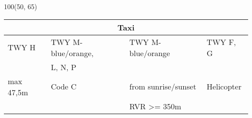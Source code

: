 \documentclass[10pt,landscape,a4paper]{article}
\begin{document}
\begin{textblock}{100}(50, 65)
\begin{table}[]
\begin{tabular}{|l|l|l|l|}
\multicolumn{4}{c}{\textbf{Taxi}} \\ \hline
TWY H & TWY M-blue/orange,  & TWY M-blue/orange & TWY F, G \\ 
& L, N, P & & \\ \hline
max 47,5m & Code C & from sunrise/sunset & Helicopter \\
& & RVR >= 350m  & \\ \hline
\end{tabular}
\end{table}
\end{textblock}
\end{document}
